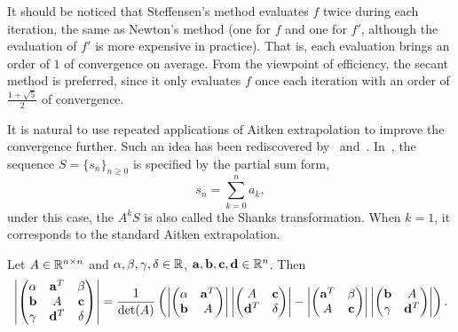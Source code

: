 \begin{remark}
    It should be noticed that Steffensen's method evaluates $f$ twice during each iteration, the same as Newton's method (one for $f$ and one for $f'$, although the evaluation of $f'$ is more expensive in practice). That is, each evaluation brings an order of $1$ of convergence on average. From the viewpoint of efficiency, the secant method is preferred, since it only evaluates $f$ once each iteration with an order of $\frac{1+\sqrt{5}}{2}$ of convergence. 
\end{remark}
It is natural to use repeated applications of Aitken extrapolation to improve the convergence further. Such an idea has been rediscovered by~\cite{schmidt1941xxxii} and~\cite{shanks1955non}. In~\cite{shanks1955non}, the sequence $S = \{s_n\}_{n\ge 0}$ is specified by the partial sum form,
\begin{equation}
    s_n = \sum_{k=0}^n a_k, 
\end{equation}
under this case, the $A^k S$ is also called the Shanks transformation. When $k=1$, it corresponds to the standard Aitken extrapolation.
\begin{lemma}
Let $A\in \mathbb R^{n\times n}$ and $\alpha, \beta,\gamma, \delta\in\mathbb R$, $\mathbf a, \mathbf b,\mathbf c,\mathbf d\in\mathbb R^{n}$. Then
\begin{equation}
     \left| \begin{pmatrix}
      \alpha & \mathbf a^{T} & \beta  \\
        \mathbf b & A & \mathbf c \\
        \gamma & \mathbf d^T & \delta 
    \end{pmatrix}\right| = \frac{1}{\det(A)} \left(  \left| \begin{pmatrix}
      \alpha & \mathbf a^{T}   \\
        \mathbf b & A  
    \end{pmatrix}\right|     \left| \begin{pmatrix}
     A & \mathbf c \\
       \mathbf d^T & \delta 
    \end{pmatrix}\right|  -     \left| \begin{pmatrix}
      \mathbf a^{T} & \beta  \\
         A & \mathbf c \\ 
    \end{pmatrix}\right|     \left| \begin{pmatrix}
        \mathbf b & A  \\
        \gamma & \mathbf d^T  
    \end{pmatrix}\right| \right).
\end{equation}
\end{lemma}
